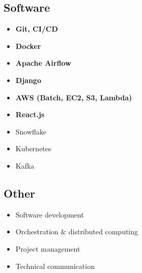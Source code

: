 \documentclass[]{resume}
\begin{document}
\begin{minipage}[t]{0.28\textwidth}
\subsection{Software}
\begin{itemize}[leftmargin=*]
    \itemsep0pt \parskip0pt 
    \item{\textbf{Git, CI/CD}}
    \item{\textbf{Docker}}
    \item{\textbf{Apache Airflow}}
    \item{\textbf{Django}}
    \item{\textbf{AWS (Batch, EC2, S3, Lambda)}}
    \item{\textbf{React.js}}
    \item{Snowflake}
    \item{Kubernetes}
    \item{Kafka}
\end{itemize}

\subsection{Other}
\begin{itemize}[leftmargin=*]
    \itemsep0pt \parskip0pt 
    \item{Software development}
    \item{Orchestration \& distributed computing}
    \item{Project management}
    \item{Technical communication}
\end{itemize}





\end{minipage}
\end{document}
